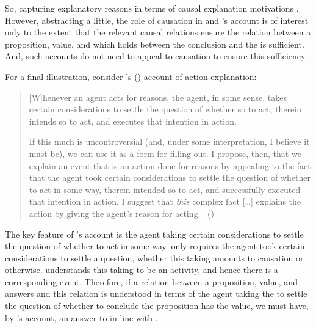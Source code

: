 \begin{note}
  So, capturing explanatory reasons in terms of causal explanation motivations \issueInclusion{}.
  However, abstracting a little, the role of causation in \citeauthor{Davidson:1963aa} and \citeauthor{Broome:2013aa}'s account is of interest only to the extent that the relevant causal relations ensure the relation between a proposition, value, and \pool{} which holds between the conclusion and the \pool{} is sufficient.
  And, such accounts do not need to appeal to causation to ensure this sufficiency.

  For a final illustration, consider \citeauthor{Hieronymi:2011aa}'s (\citeyear{Hieronymi:2011aa}) account of action explanation:

  \begin{quote}
    [W]henever an agent acts for reasons, the agent, in some sense, takes certain considerations to settle the question of whether so to act, therein intends so to act, and executes that intention in action.

    If this much is uncontroversial (and, under some interpretation, I believe it must be), we can use it as a form for filling out.
    I propose, then, that we explain an event that is an action done for reasons by appealing to the fact that the agent took certain considerations to settle the question of whether to act in some way, therein intended so to act, and successfully executed that intention in action.
    I suggest that \emph{this} complex fact [\dots] explains the action by giving the agent's reason for acting.%
    \mbox{ }\hfill\mbox{(\citeyear[421]{Hieronymi:2011aa})}
  \end{quote}

  The key feature of \citeauthor{Hieronymi:2011aa}'s account is the agent taking certain considerations to settle the question of whether to act in some way.
  \citeauthor{Hieronymi:2011aa} only requires the agent took certain considerations to settle a question, whether this taking amounts to causation or otherwise.
  \citeauthor{Hieronymi:2011aa} understands this taking to be an activity, and hence there is a corresponding event.
  Therefore, if a relation between a proposition, value, and \pool{} answers \qWhy{} and this relation is understood in terms of the agent taking the \pool{} to settle the question of whether to conclude the proposition has the value, we must have, by \citeauthor{Hieronymi:2011aa}'s account, an answer to \qHow{} in line with \issueInclusion{}.
\end{note}

